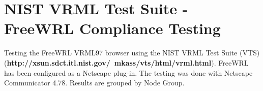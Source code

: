 \documentclass[12pt,letterpaper]{article}
\begin{document}
\part*{NIST VRML Test Suite - FreeWRL Compliance Testing}

Testing the FreeWRL VRML97 browser using the NIST VRML Test Suite (VTS)\\
(\textbf{http://xsun.sdct.itl.nist.gov/~mkass/vts/html/vrml.html}).
FreeWRL has been configured as a Netscape plug-in.
The testing was done with Netscape Communicator 4.78.
Results are grouped by Node Group.












\end{document}
